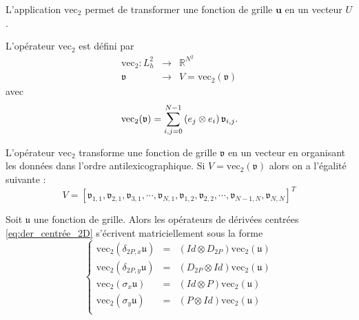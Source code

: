 L'application $\text{vec}_2$ permet de transformer une fonction de grille $\mathbf{u}$ en un vecteur $U$.

\begin{definition}
L'opérateur $\text{vec}_2$ est défini par
\begin{equation}
\begin{array}{rcl}
\text{vec}_2 : L^2_h & \longrightarrow & \mathbb{R}^{N^2}\\
\mathfrak{v} & \longrightarrow & V = \text{vec}_2(\mathfrak{v})
\end{array}
\end{equation}
avec
\begin{equation}
\text{vec}_2(\mathfrak{v}) = \displaystyle\sum\limits_{i,j=0}^{N-1} \left( e_j \otimes e_i \right)\mathfrak{v}_{i,j}.
\end{equation}
\end{definition}

L'opérateur $\text{vec}_2$ transforme une fonction de grille $\mathfrak{v}$ en un vecteur en organisant les données dans l'ordre antilexicographique. Si $V = \text{vec}_2 (\mathfrak{v})$ alors on a l'égalité suivante :
\begin{equation}
V=[\mathfrak{v}_{1,1}, \mathfrak{v}_{2,1}, \mathfrak{v}_{3,1}, \cdots, \mathfrak{v}_{N,1}, \mathfrak{v}_{1,2}, \mathfrak{v}_{2,2}, \cdots,  \mathfrak{v}_{N-1,N}, \mathfrak{v}_{N,N}]^T
\end{equation}

\begin{proposition}
Soit $\mathfrak{u}$ une fonction de grille. Alors les opérateurs de dérivées centrées \eqref{eq:der_centrée_2D} s'écrivent matriciellement sous la forme
\begin{equation}
\left\lbrace
\begin{array}{rcl}
\text{vec}_2(\delta_{2P,x} \mathfrak{u}) & = & (Id \otimes D_{2P}) \text{vec}_2(\mathfrak{u})\\
\text{vec}_2(\delta_{2P,y} \mathfrak{u}) & = & (D_{2P} \otimes Id) \text{vec}_2(\mathfrak{u})\\
\text{vec}_2(\sigma_x \mathfrak{u}) & = & (Id \otimes P) \text{vec}_2(\mathfrak{u})\\
\text{vec}_2(\sigma_y \mathfrak{u}) & = & (P \otimes Id) \text{vec}_2(\mathfrak{u})\\
\end{array}\right.
\end{equation}
\label{prop:op_der_simpson_mat}
\end{proposition}

